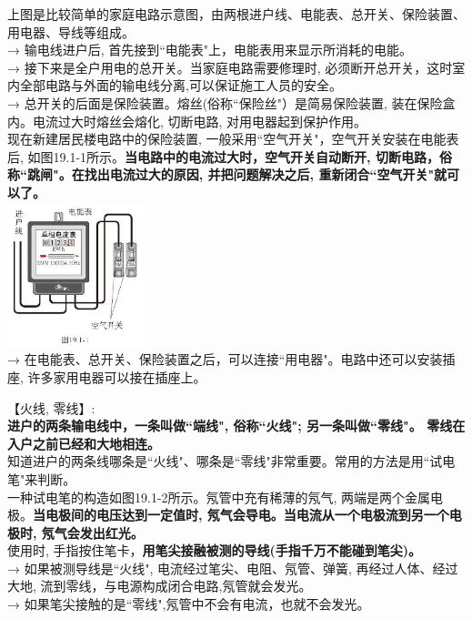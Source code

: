 \documentclass[UTF8]{ctexart}
\begin{document}
上图是比较简单的家庭电路示意图，由两根进户线、电能表、总开关、保险装置、用电器、导线等组成。 \\
→ 输电线进户后, 首先接到``电能表"上，电能表用来显示所消耗的电能。 \\
→ 接下来是全户用电的总开关。当家庭电路需要修理时, 必须断开总开关，这时室内全部电路与外面的输电线分离,可以保证施工人员的安全。 \\
→ 总开关的后面是保险装置。熔丝(俗称``保险丝"）是简易保险装置, 装在保险盒内。电流过大时熔丝会熔化, 切断电路, 对用电器起到保护作用。 \\
现在新建居民楼电路中的保险装置, 一般采用``空气开关"，空气开关安装在电能表后, 如图19.1-1所示。\textbf{当电路中的电流过大时，空气开关自动断开, 切断电路，俗称``跳闸"。在找出电流过大的原因, 并把问题解决之后, 重新闭合``空气开关"就可以了。} \\

\includegraphics[width=0.3\textwidth]{img/0062.png} \\

→ 在电能表、总开关、保险装置之后，可以连接``用电器"。电路中还可以安装插座, 许多家用电器可以接在插座上。



【火线, 零线】: \\
\textbf{进户的两条输电线中，一条叫做``端线", 俗称``火线"; 另一条叫做``零线"。 零线在入户之前已经和大地相连。} \\
知道进户的两条线哪条是``火线"、哪条是``零线"非常重要。常用的方法是用``试电笔"来判断。 \\
一种试电笔的构造如图19.1-2所示。氖管中充有稀薄的氖气, 两端是两个金属电极。\textbf{当电极间的电压达到一定值时, 氖气会导电。当电流从一个电极流到另一个电极时, 氖气会发出红光。} \\

使用时, 手指按住笔卡，\textbf{用笔尖接融被测的导线(手指千万不能碰到笔尖)。} \\
→ 如果被测导线是``火线", 电流经过笔尖、电阻、氖管、弹簧, 再经过人体、经过大地, 流到零线，与电源构成闭合电路,氖管就会发光。 \\
→ 如果笔尖接触的是``零线",氖管中不会有电流，也就不会发光。 \\
\end{document}
